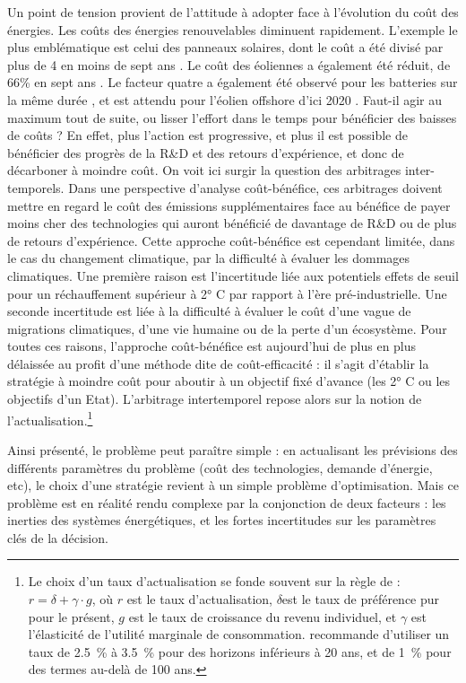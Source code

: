 Un point de tension provient de l’attitude à adopter face à l’évolution du coût des énergies. Les coûts des énergies renouvelables diminuent rapidement. L’exemple le plus emblématique est celui des panneaux solaires, dont le coût a été divisé par plus de 4 en moins de sept ans \citep{Lazard2016}. Le coût des éoliennes a également été réduit, de 66\% en sept ans \citep{Lazard2016}. Le facteur quatre a également été observé pour les batteries sur la même durée \citep{McKinsey2017EV}, et est attendu pour l’éolien offshore d’ici 2020 \citep{McKinsey2017Wind}. Faut-il agir au maximum tout de suite, ou lisser l’effort dans le temps pour bénéficier des baisses de coûts ? En effet, plus l’action est progressive, et plus il est possible de bénéficier des progrès de la R\&D et des retours d’expérience, et donc de décarboner à moindre coût.
On voit ici surgir la question des arbitrages inter-temporels. Dans une perspective d’analyse coût-bénéfice, ces arbitrages doivent mettre en regard le coût des émissions supplémentaires face au bénéfice de payer moins cher des technologies qui auront bénéficié de davantage de R\&D ou de plus de retours d’expérience. Cette approche coût-bénéfice est cependant limitée, dans le cas du changement climatique, par la difficulté à évaluer les dommages climatiques. Une première raison est l’incertitude liée aux potentiels effets de seuil pour un réchauffement supérieur à 2° C par rapport à l'ère pré-industrielle. Une seconde incertitude est liée à la difficulté à évaluer le coût d’une vague de migrations climatiques, d’une vie humaine ou de la perte d’un écosystème. 
Pour toutes ces raisons, l’approche coût-bénéfice est aujourd’hui de plus en plus délaissée au profit d’une méthode dite de coût-efficacité : il s’agit d’établir la stratégie à moindre coût pour aboutir à un objectif fixé d’avance (les 2° C ou les objectifs d’un Etat). L’arbitrage intertemporel repose alors sur la notion de l’actualisation.\footnote{Le choix d’un taux d’actualisation se fonde souvent sur la règle de \citet{Ramsey1928} : $r = \delta + \gamma \cdot g$,
où $r$ est le taux d’actualisation, $\delta$est le taux de préférence pur pour le présent, $g$ est le taux de croissance du revenu individuel, et $\gamma$ est l’élasticité de l’utilité marginale de consommation. \citet{Gollier2011} recommande d’utiliser un taux de 2.5~\% à 3.5~\% pour des horizons inférieurs à 20 ans, et de 1~\% pour des termes au-delà de 100 ans. 
} 

Ainsi présenté, le problème peut paraître simple : en actualisant les prévisions des différents paramètres du problème (coût des technologies, demande d’énergie, etc), le choix d’une stratégie revient à un simple problème d’optimisation. 
Mais ce problème est en réalité rendu complexe par la conjonction de deux facteurs : les inerties des systèmes énergétiques, et les fortes incertitudes sur les paramètres clés de la décision.

